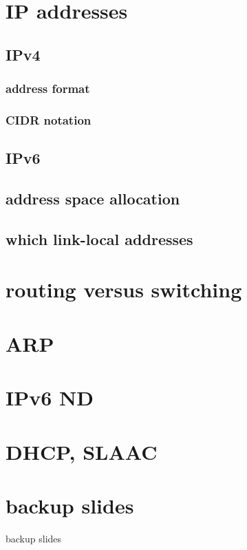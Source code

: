 \date{}
\title{}
\date{}

\begin{frame}
    \titlepage
\end{frame}

\section{IP addresses}

\subsection{IPv4}

\subsubsection{address format}


\subsubsection{CIDR notation}


\subsection{IPv6}


\subsection{address space allocation}


\subsection{which link-local addresses}


\section{routing versus switching}


\section{ARP}

\section{IPv6 ND}

\section{DHCP, SLAAC}



\section{backup slides}
\begin{frame}{backup slides}
\end{frame}


